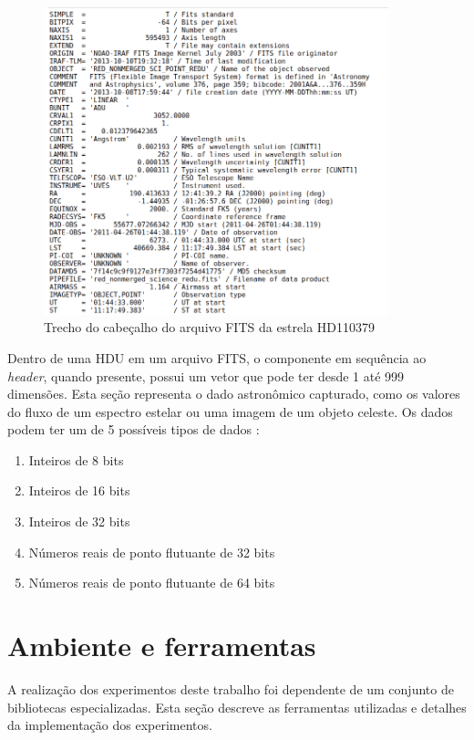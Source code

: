 \begin{figure}[htb]
\centering
\includegraphics[width=10cm]{figuras/fits_header.png}
\caption{Trecho do cabeçalho do arquivo FITS da estrela HD110379}
\label{fig:fits-header}
\end{figure}

Dentro de uma HDU em um arquivo FITS, o componente em sequência ao \textit{header}, quando presente, possui um vetor que pode ter desde 1 até 999 dimensões. Esta seção representa o dado astronômico capturado, como os valores do fluxo de um espectro estelar ou uma imagem de um objeto celeste. Os dados podem ter um de 5 possíveis tipos de dados \citep{pence2010definition}:

\begin{enumerate}
    \item Inteiros de 8 bits
    \item Inteiros de 16 bits
    \item Inteiros de 32 bits
    \item Números reais de ponto flutuante de 32 bits
    \item Números reais de ponto flutuante de 64 bits
\end{enumerate}

\section{Ambiente e ferramentas}

A realização dos experimentos deste trabalho foi dependente de um conjunto de bibliotecas especializadas. Esta seção descreve as ferramentas utilizadas e detalhes da implementação dos experimentos.

